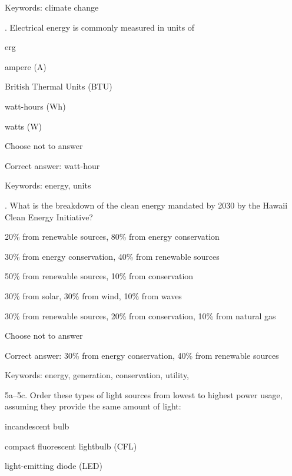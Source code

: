 Keywords: climate change

\vspace{5 mm}
. Electrical energy is commonly measured in units of

\begin{answer}
	\item erg
	\item ampere (A)
	\item British Thermal Units (BTU)
	\item watt-hours (Wh)
	\item watts (W)
	\item Choose not to answer
\end{answer}

Correct answer: watt-hour

Keywords: energy, units

\vspace{5 mm}
. What is the breakdown of the clean energy mandated by 2030 by the Hawaii Clean Energy Initiative?

\begin{answer}
	\item 20\% from renewable sources, 80\% from energy conservation
	\item 30\% from energy conservation, 40\% from renewable sources
	\item 50\% from renewable sources, 10\% from conservation
	\item 30\% from solar, 30\% from wind, 10\% from waves
	\item 30\% from renewable sources, 20\% from conservation, 10\% from natural gas
	\item Choose not to answer
\end{answer}

Correct answer: 30\% from energy conservation, 40\% from renewable sources

Keywords: energy, generation, conservation, utility, \Hawaii

\vspace{5 mm}
\noindent
5a--5c. Order these types of light sources from lowest to highest power usage, assuming they provide the same amount of light:

\begin{answer}
	\item incandescent bulb
	\item compact fluorescent lightbulb (CFL)
	\item light-emitting diode (LED)
\end{answer}

